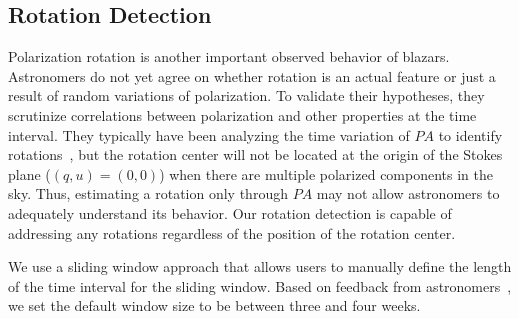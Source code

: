 \subsection{Rotation Detection}\label{sec:rotationDetection}
Polarization rotation is another important observed behavior of blazars. 
Astronomers do not yet agree on whether rotation is an actual feature or just a result of random variations of polarization.
To validate their hypotheses, they scrutinize correlations between polarization and other properties at the time interval.
They typically have been analyzing the time variation of $PA$ to identify rotations~\cite{Ikejiri2011, Uemura2017},
but the rotation center will not be located at the origin of the Stokes plane ($(q, u) = (0, 0)$) when there are multiple polarized components in the sky.
Thus, estimating a rotation only through $PA$ may not allow astronomers to adequately understand its behavior.
Our rotation detection is capable of addressing any rotations regardless of the position of the rotation center.

We use a sliding window approach that allows users to manually define the length of the time interval for the sliding window. Based on feedback from astronomers~\cite{Sasada2012}, we set the default window size to be between three and four weeks.

